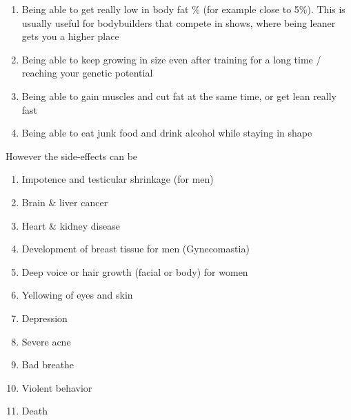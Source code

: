 \documentclass[openany, 12pt]{book}
\begin{document}
	\begin{enumerate}
		\item Being able to get really low in body fat \% (for example close to 5\%). This is usually useful for bodybuilders that compete in shows, where being leaner gets you a higher place
		\item Being able to keep growing in size even after training for a long time / reaching your genetic potential
		\item Being able to gain muscles and cut fat at the same time, or get lean really fast
		\item Being able to eat junk food and drink alcohol while staying in shape
	\end{enumerate}

        However the side-effects can be

	\begin{enumerate}
		\item Impotence and testicular shrinkage (for men)
		\item Brain \& liver cancer
		\item Heart \& kidney disease
		\item Development of breast tissue for men (Gynecomastia)
		\item Deep voice or hair growth (facial or body) for women
		\item Yellowing of eyes and skin
		\item Depression
		\item Severe acne
		\item Bad breathe
		\item Violent behavior
		\item Death
	\end{enumerate}
\end{document}
